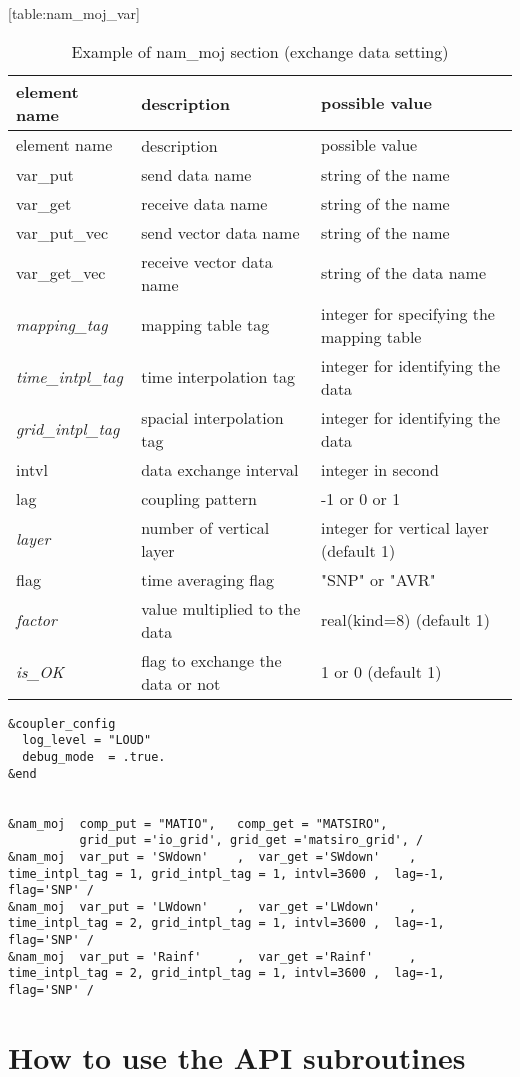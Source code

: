 \protect\hypertarget{table:nam_moj_var}{}{{[}table:nam\_moj\_var{]}}

\hypertarget{table:nam_moj_var}{}
\begin{longtable}[]{@{}lll@{}}
\caption{Example of nam\_moj section (exchange data
setting)}\tabularnewline
\toprule
element name & description　 & possible value\tabularnewline
\midrule
\endfirsthead
\toprule
element name & description　 & possible value\tabularnewline
\midrule
\endhead
var\_put & send data name & string of the name\tabularnewline
var\_get & receive data name & string of the name\tabularnewline
var\_put\_vec & send vector data name & string of the
name\tabularnewline
var\_get\_vec & receive vector data name & string of the data
name\tabularnewline
\emph{mapping\_tag} & mapping table tag & integer for specifying the
mapping table\tabularnewline
\emph{time\_intpl\_tag} & time interpolation tag & integer for
identifying the data\tabularnewline
\emph{grid\_intpl\_tag} & spacial interpolation tag & integer for
identifying the data\tabularnewline
intvl & data exchange interval & integer in second\tabularnewline
lag & coupling pattern & -1 or 0 or 1\tabularnewline
\emph{layer} & number of vertical layer & integer for vertical layer
(default 1)\tabularnewline
flag & time averaging flag & "SNP" or "AVR"\tabularnewline
\emph{factor} & value multiplied to the data & real(kind=8) (default
1)\tabularnewline
\emph{is\_OK} & flag to exchange the data or not & 1 or 0 (default
1)\tabularnewline
\bottomrule
\end{longtable}

\hypertarget{list:moj_namelist_sample}{%
\label{list:moj_namelist_sample}}%
\begin{verbatim}
&coupler_config
  log_level = "LOUD"
  debug_mode  = .true.
&end


&nam_moj  comp_put = "MATIO",   comp_get = "MATSIRO",
          grid_put ='io_grid', grid_get ='matsiro_grid', /
&nam_moj  var_put = 'SWdown'    ,  var_get ='SWdown'    , time_intpl_tag = 1, grid_intpl_tag = 1, intvl=3600 ,  lag=-1, flag='SNP' /
&nam_moj  var_put = 'LWdown'    ,  var_get ='LWdown'    , time_intpl_tag = 2, grid_intpl_tag = 1, intvl=3600 ,  lag=-1, flag='SNP' /
&nam_moj  var_put = 'Rainf'     ,  var_get ='Rainf'     , time_intpl_tag = 2, grid_intpl_tag = 1, intvl=3600 ,  lag=-1, flag='SNP' /
\end{verbatim}

\hypertarget{how-to-use-the-api-subroutines}{%
\section{How to use the API
subroutines}\label{how-to-use-the-api-subroutines}}

